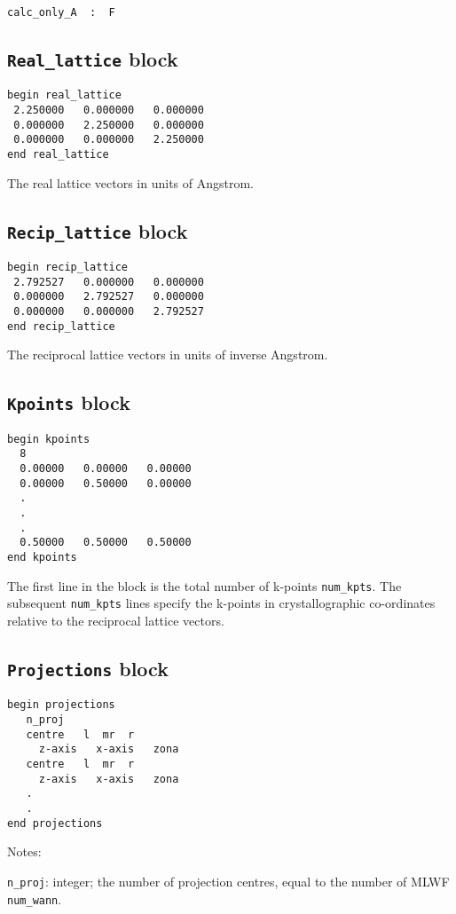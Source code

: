\verb#calc_only_A  :  F#

\subsection{{\tt Real\_lattice} block}
\begin{verbatim}
begin real_lattice
 2.250000   0.000000   0.000000
 0.000000   2.250000   0.000000
 0.000000   0.000000   2.250000
end real_lattice
\end{verbatim}

The real lattice vectors in units of Angstrom.


\subsection{{\tt Recip\_lattice} block}
\begin{verbatim}
begin recip_lattice
 2.792527   0.000000   0.000000
 0.000000   2.792527   0.000000
 0.000000   0.000000   2.792527
end recip_lattice
\end{verbatim}

The reciprocal lattice vectors in units of inverse Angstrom.


\subsection{{\tt Kpoints} block}
\begin{verbatim}
begin kpoints
  8
  0.00000   0.00000   0.00000
  0.00000   0.50000   0.00000
  .
  .
  .
  0.50000   0.50000   0.50000
end kpoints
\end{verbatim}

The first line in the block is the total number of k-points
\verb#num_kpts#. The subsequent \verb#num_kpts# lines specify the
k-points in crystallographic co-ordinates relative to the reciprocal
lattice vectors.


\subsection{{\tt Projections} block}
\begin{verbatim}
begin projections
   n_proj
   centre   l  mr  r   
     z-axis   x-axis   zona
   centre   l  mr  r   
     z-axis   x-axis   zona
   .
   .
end projections
\end{verbatim}

\noindent
Notes:

\verb#n_proj#: integer; the number of projection centres, equal to the
number of MLWF \verb#num_wann#.

